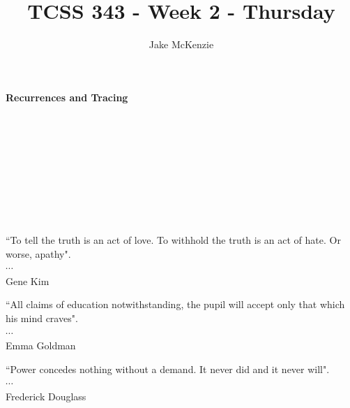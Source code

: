 \documentclass[12pt]{article}
\begin{document}
\title{TCSS 343 - Week 2 - Thursday}
\author{Jake McKenzie}
\maketitle
\noindent\centerline{\textbf{Recurrences and Tracing}}\\\\\\\\\\\\\\\\
\begin{center}
    ``To tell the truth is an act of love. To withhold the truth is an act of hate. Or worse, apathy". \\$\cdots$\\ Gene Kim
\end{center}
\begin{center}
    ``All claims of education notwithstanding, the pupil will accept only that which his mind craves". \\$\cdots$\\ Emma Goldman
\end{center}
\begin{center}
    ``Power concedes nothing without a demand. It never did and it never will". \\$\cdots$\\ Frederick Douglass
\end{center}
\newpage
\end{document}
